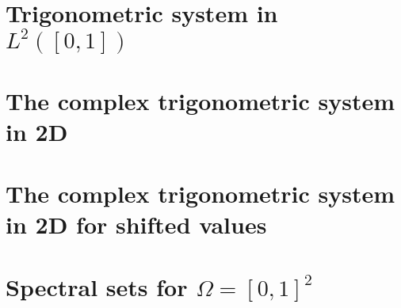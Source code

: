 \documentclass[../thesis.tex]{subfiles}
\begin{document}
\section{Trigonometric system in $L^2([0,1])$}\label{sec:complx_trig_1d}
    


\section{The complex trigonometric system in 2D}\label{sec:complx_trig_2d}
    

\section{The complex trigonometric system in 2D for shifted values}
    



\section{Spectral sets for $\Omega = [0,1]^2$}
\end{document}
